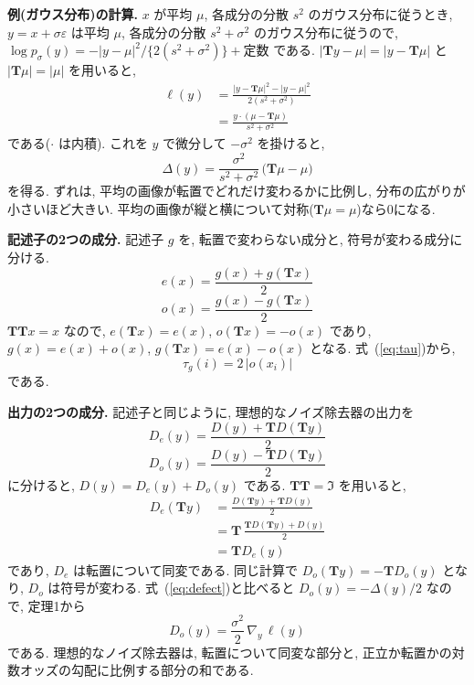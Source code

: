 \documentclass[MIRU,submit]{miru2025j}
\newcommand{\Tm}{\mathbf{T}}            %
\renewcommand{\eqref}[1]{(\ref{#1})}
\begin{document}
\textbf{例(ガウス分布)の計算.} $x$ が平均 $\mu$, 各成分の分散 $s^{2}$ のガウス分布に従うとき, $y=x+\sigma\varepsilon$ は平均 $\mu$, 各成分の分散 $s^{2}+\sigma^{2}$ のガウス分布に従うので, $\log p_\sigma(y)=-|y-\mu|^{2}/\{2(s^{2}+\sigma^{2})\}+$定数 である. $|\Tm y-\mu|=|y-\Tm\mu|$ と $|\Tm\mu|=|\mu|$ を用いると,
\begin{equation}
\begin{split}
\ell(y)&=\frac{|y-\Tm\mu|^{2}-|y-\mu|^{2}}{2(s^{2}+\sigma^{2})}\\
&=\frac{y\cdot(\mu-\Tm\mu)}{s^{2}+\sigma^{2}}
\end{split}
\label{eq:gauss2}
\end{equation}
である($\cdot$ は内積). これを $y$ で微分して $-\sigma^{2}$ を掛けると,
\begin{equation}
\Delta(y)=\frac{\sigma^{2}}{s^{2}+\sigma^{2}}\,\bigl(\Tm\mu-\mu\bigr)
\label{eq:gauss}
\end{equation}
を得る. ずれは, 平均の画像が転置でどれだけ変わるかに比例し, 分布の広がりが小さいほど大きい. 平均の画像が縦と横について対称($\Tm\mu=\mu$)なら0になる.

\textbf{記述子の2つの成分.} 記述子 $g$ を, 転置で変わらない成分と, 符号が変わる成分に分ける.
\begin{equation}
e(x)=\frac{g(x)+g(\Tm x)}{2}
\label{eq:even}
\end{equation}
\begin{equation}
o(x)=\frac{g(x)-g(\Tm x)}{2}
\label{eq:odd}
\end{equation}
$\Tm\Tm x=x$ なので, $e(\Tm x)=e(x)$, $o(\Tm x)=-o(x)$ であり, $g(x)=e(x)+o(x)$, $g(\Tm x)=e(x)-o(x)$ となる. 式~\eqref{eq:tau}から,
\begin{equation}
\tau_g(i)=2\,\bigl|o(x_i)\bigr|
\label{eq:tauodd}
\end{equation}
である.

\textbf{出力の2つの成分.} 記述子と同じように, 理想的なノイズ除去器の出力を
\begin{equation}
D_e(y)=\frac{D(y)+\Tm D(\Tm y)}{2}
\label{eq:De}
\end{equation}
\begin{equation}
D_o(y)=\frac{D(y)-\Tm D(\Tm y)}{2}
\label{eq:Do}
\end{equation}
に分けると, $D(y)=D_e(y)+D_o(y)$ である. $\Tm\Tm=\Im$ を用いると,
\begin{equation}
\begin{split}
D_e(\Tm y)&=\frac{D(\Tm y)+\Tm D(y)}{2}\\
&=\Tm\,\frac{\Tm D(\Tm y)+D(y)}{2}\\
&=\Tm D_e(y)
\end{split}
\label{eq:Deq}
\end{equation}
であり, $D_e$ は転置について同変である. 同じ計算で $D_o(\Tm y)=-\Tm D_o(y)$ となり, $D_o$ は符号が変わる. 式~\eqref{eq:defect}と比べると $D_o(y)=-\Delta(y)/2$ なので, 定理1から
\begin{equation}
D_o(y)=\frac{\sigma^{2}}{2}\,\nabla_y\,\ell(y)
\label{eq:Do2}
\end{equation}
である. 理想的なノイズ除去器は, 転置について同変な部分と, 正立か転置かの対数オッズの勾配に比例する部分の和である.
\end{document}
